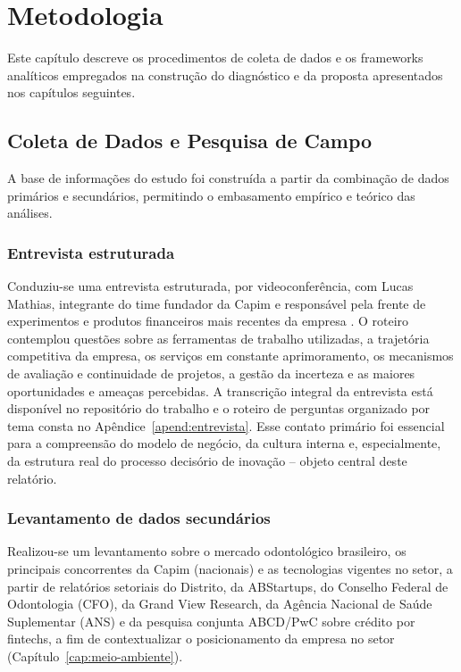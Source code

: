 
\chapter{Metodologia}
\label{cap:metodologia}

Este capítulo descreve os procedimentos de coleta de dados e os frameworks analíticos empregados na construção do diagnóstico e da proposta apresentados nos capítulos seguintes.

\section{Coleta de Dados e Pesquisa de Campo}

A base de informações do estudo foi construída a partir da combinação de dados primários e secundários, permitindo o embasamento empírico e teórico das análises.

\subsection{Entrevista estruturada}

Conduziu-se uma entrevista estruturada, por videoconferência, com Lucas Mathias, integrante do time fundador da Capim e responsável pela frente de experimentos e produtos financeiros mais recentes da empresa \cite{capimentrevista2026}. O roteiro contemplou questões sobre as ferramentas de trabalho utilizadas, a trajetória competitiva da empresa, os serviços em constante aprimoramento, os mecanismos de avaliação e continuidade de projetos, a gestão da incerteza e as maiores oportunidades e ameaças percebidas. A transcrição integral da entrevista está disponível no repositório do trabalho e o roteiro de perguntas organizado por tema consta no Apêndice~\ref{apend:entrevista}. Esse contato primário foi essencial para a compreensão do modelo de negócio, da cultura interna e, especialmente, da estrutura real do processo decisório de inovação -- objeto central deste relatório.

\subsection{Levantamento de dados secundários}

Realizou-se um levantamento sobre o mercado odontológico brasileiro, os principais concorrentes da Capim (nacionais) e as tecnologias vigentes no setor, a partir de relatórios setoriais do Distrito, da ABStartups, do Conselho Federal de Odontologia (CFO), da Grand View Research, da Agência Nacional de Saúde Suplementar (ANS) e da pesquisa conjunta ABCD/PwC sobre crédito por fintechs, a fim de contextualizar o posicionamento da empresa no setor (Capítulo~\ref{cap:meio-ambiente}).


